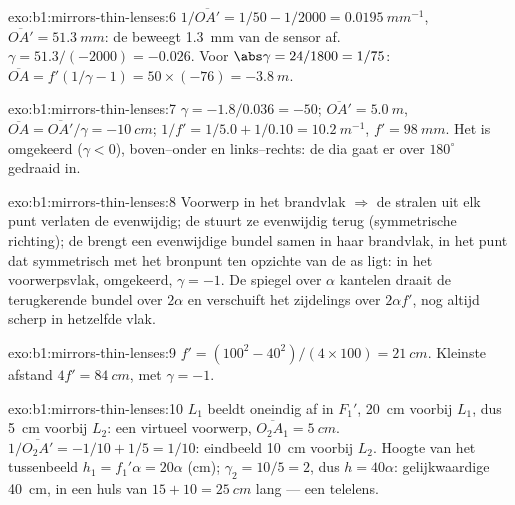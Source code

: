 \begin{solution}{exo:b1:mirrors-thin-lenses:6}
$1/\overline{OA'} = 1/50 - 1/2000 = \qty{0.0195}{mm^{-1}}$,
$\overline{OA'} = \qty{51.3}{mm}$: de  beweegt \qty{1.3}{mm} van
de sensor af. $\gamma = 51.3/(-2000) = -0.026$. Voor $\abs\gamma = 24/1800
= 1/75$: $\overline{OA} = f'(1/\gamma - 1) = 50 \times (-76) =
\qty{-3.8}{m}$.
\end{solution}

\begin{solution}{exo:b1:mirrors-thin-lenses:7}
$\gamma = -1.8/0.036 = -50$; $\overline{OA'} = \qty{5.0}{m}$,
$\overline{OA} = \overline{OA'}/\gamma = \qty{-10}{cm}$;
$1/f' = 1/5.0 + 1/0.10 = \qty{10.2}{m^{-1}}$, $f' = \qty{98}{mm}$. Het
 is omgekeerd ($\gamma < 0$), boven--onder en links--rechts: de dia
gaat er over $180^\circ$ gedraaid in.
\end{solution}

\begin{solution}{exo:b1:mirrors-thin-lenses:8}
Voorwerp in het brandvlak $\Rightarrow$ de stralen uit elk punt verlaten de
 evenwijdig; de  stuurt ze evenwijdig terug (symmetrische
richting); de  brengt een evenwijdige bundel samen in haar brandvlak, in
het punt dat symmetrisch met het bronpunt ten opzichte van de as ligt:  in
het voorwerpsvlak, omgekeerd, $\gamma = -1$. De spiegel over $\alpha$ kantelen
draait de terugkerende bundel over $2\alpha$ en verschuift het  zijdelings
over $2\alpha f'$, nog altijd scherp in hetzelfde vlak.
\end{solution}

\begin{solution}{exo:b1:mirrors-thin-lenses:9}
$f' = (100^2 - 40^2)/(4 \times 100) = \qty{21}{cm}$. Kleinste afstand
$4f' = \qty{84}{cm}$, met $\gamma = -1$.
\end{solution}

\begin{solution}{exo:b1:mirrors-thin-lenses:10}
$L_1$ beeldt oneindig af in $F_1'$, \qty{20}{cm} voorbij $L_1$, dus \qty{5}{cm}
voorbij $L_2$: een virtueel voorwerp, $\overline{O_2A_1} = \qty{+5}{cm}$.
$1/\overline{O_2A'} = -1/10 + 1/5 = 1/10$: eindbeeld \qty{10}{cm}
voorbij $L_2$. Hoogte van het tussenbeeld $h_1 = f_1'\alpha = 20\alpha$ (cm);
$\gamma_2 = 10/5 = 2$, dus $h = 40\alpha$: gelijkwaardige 
\qty{40}{cm}, in een huls van $15 + 10 = \qty{25}{cm}$ lang --- een telelens.
\end{solution}

